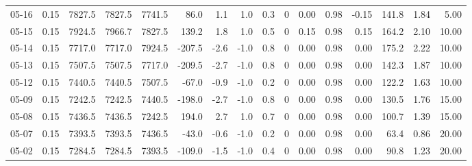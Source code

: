 \begin{threeparttable}
{\begin{tabular}{lrrrrrrrrrrrrrrr}
  05-16 &     0.15 & 7827.5 & 7827.5 & 7741.5 &       86.0 &            1.1 &                      1.0 &                 0.3 &              0 &       0.00 &      0.98 &          -0.15 &            141.8 &            1.84 &                   5.00 \\
  05-15 &     0.15 & 7924.5 & 7966.7 & 7827.5 &      139.2 &            1.8 &                      1.0 &                 0.5 &              0 &       0.15 &      0.98 &           0.15 &            164.2 &            2.10 &                  10.00 \\
  05-14 &     0.15 & 7717.0 & 7717.0 & 7924.5 &     -207.5 &           -2.6 &                     -1.0 &                 0.8 &              0 &       0.00 &      0.98 &           0.00 &            175.2 &            2.22 &                  10.00 \\
  05-13 &     0.15 & 7507.5 & 7507.5 & 7717.0 &     -209.5 &           -2.7 &                     -1.0 &                 0.8 &              0 &       0.00 &      0.98 &           0.00 &            142.3 &            1.87 &                  10.00 \\
  05-12 &     0.15 & 7440.5 & 7440.5 & 7507.5 &      -67.0 &           -0.9 &                     -1.0 &                 0.2 &              0 &       0.00 &      0.98 &           0.00 &            122.2 &            1.63 &                  10.00 \\
  05-09 &     0.15 & 7242.5 & 7242.5 & 7440.5 &     -198.0 &           -2.7 &                     -1.0 &                 0.8 &              0 &       0.00 &      0.98 &           0.00 &            130.5 &            1.76 &                  15.00 \\
  05-08 &     0.15 & 7436.5 & 7436.5 & 7242.5 &      194.0 &            2.7 &                      1.0 &                 0.7 &              0 &       0.00 &      0.98 &           0.00 &            100.7 &            1.39 &                  15.00 \\
  05-07 &     0.15 & 7393.5 & 7393.5 & 7436.5 &      -43.0 &           -0.6 &                     -1.0 &                 0.2 &              0 &       0.00 &      0.98 &           0.00 &             63.4 &            0.86 &                  20.00 \\
  05-02 &     0.15 & 7284.5 & 7284.5 & 7393.5 &     -109.0 &           -1.5 &                     -1.0 &                 0.4 &              0 &       0.00 &      0.98 &           0.00 &             90.8 &            1.23 &                  20.00 \\

\end{tabular}}
\end{threeparttable}
